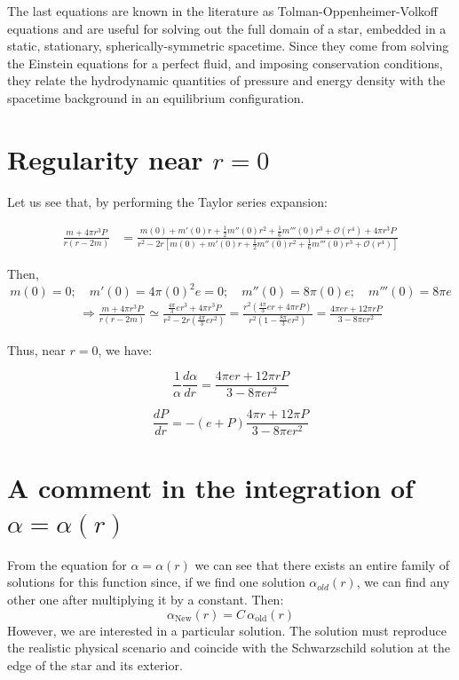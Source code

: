 \documentclass[12pt]{report}
\begin{document}
	The last equations are known in the literature as Tolman-Oppenheimer-Volkoff equations and are useful for solving out the full domain of a star, embedded in a static, stationary, spherically-symmetric spacetime. Since they come from solving the Einstein equations for a perfect fluid, and imposing conservation conditions, they relate the hydrodynamic quantities of pressure and energy density with the spacetime background in an equilibrium configuration.\\
	
	\section{Regularity near $r=0$}
	
	Let us see that, by performing the Taylor series expansion:
	
	\begin{align*}
		\frac{m+4\pi r^3 P}{r(r-2m)} &= \frac{m(0) + m'(0)r + \frac{1}{2}m''(0)r^2 + \frac{1}{6}m'''(0)r^3 + \mathcal{O}(r^4) + 4\pi r^3 P}{r^2-2r[m(0)+ m'(0)r + \frac{1}{2}m''(0)r^2 + \frac{1}{6}m'''(0)r^3 + \mathcal{O}(r^4)]}
	\end{align*}
	
	Then,
	\begin{equation}
		m(0)=0; \quad m'(0)=4\pi(0)^2e=0; \quad m''(0)=8\pi(0)e; \quad m'''(0)=8\pi e
	\end{equation}
	\begin{align*}
		\Rightarrow \frac{m+4\pi r^3 P}{r(r-2m)} \simeq \frac{\frac{4\pi}{3}e r^3+4\pi r^3 P}{r^2-2r(\frac{4\pi}{3}e r^2)} = \frac{r^2\left(\frac{4\pi}{3}e r+4\pi r P\right)}{r^2\left(1-\frac{8\pi}{3}e r^2\right)} = \frac{4\pi e r+12\pi rP}{3-8\pi e r^2}
	\end{align*}
	
	Thus, near $r=0$, we have:
	
	\begin{equation}
		\frac{1}{\alpha}\frac{d\alpha}{dr} = \frac{4\pi e r + 12\pi rP}{3-8\pi e r^2}
	\end{equation}
	
	\begin{equation}
		\frac{dP}{dr} = -(e+P)\frac{4\pi  r + 12\pi P}{3-8\pi e r^2}
	\end{equation}
	\section{A comment in the integration of $\alpha=\alpha(r)$}
	From the equation for $\alpha=\alpha(r)$ we can see that there exists an entire family of solutions for this function since, if we find one solution $\alpha_{old}(r)$, we can find any other one after multiplying it by a constant. Then:
	\begin{equation}
		\alpha_{\text{New}}(r) = C\, \alpha_{\text{old}}(r)
	\end{equation}
	However, we are interested in a particular solution. The solution must reproduce the realistic physical scenario and coincide with the Schwarzschild solution at the edge of the star and its exterior.\\
	
\end{document}
